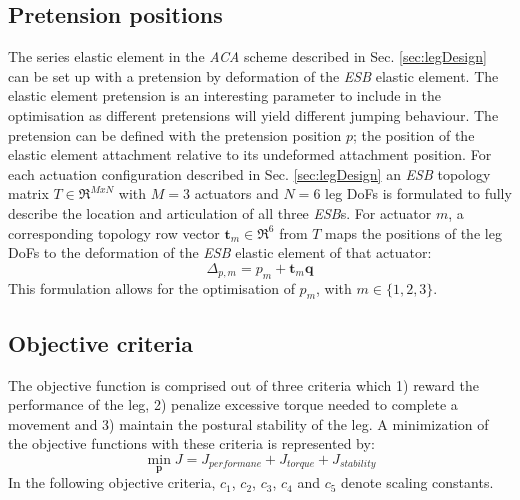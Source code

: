 \documentclass[letterpaper, 10 pt, conference]{ieeeconf}  %
\begin{document}
\subsection{Pretension positions}

The series elastic element in the \textit{ACA} scheme described in Sec. \ref{sec:legDesign} can be set up with a pretension by deformation of the \textit{ESB} elastic element. The elastic element pretension is an interesting parameter to include in the optimisation as different pretensions will yield different jumping behaviour. The pretension can be defined with the pretension position $p$; the position of the elastic element attachment relative to its undeformed attachment position. For each actuation configuration described in Sec. \ref{sec:legDesign} an \textit{ESB} topology matrix $T \in \mathfrak{R}^{M x N}$ with $M=3$ actuators and $N=6$ leg DoFs is formulated to fully describe the location and articulation of all three \textit{ESB}s. For actuator $m$, a corresponding topology row vector $\mathbf{t}_m \in \mathfrak{R}^6$ from $T$ maps the positions of the leg DoFs to the deformation of the \textit{ESB} elastic element of that actuator:
\begin{equation}
\Delta_{p,m} = p_m + \mathbf{t}_m \mathbf{q}
\end{equation}
This formulation allows for the optimisation of $p_m$, with $m \in \{1,2,3\}$.

\subsection{Objective criteria}

The objective function is comprised out of three criteria which 1) reward the performance of the leg, 2) penalize excessive torque needed to complete a movement and 3) maintain the postural stability of the leg. A minimization of the objective functions with these criteria is represented by:   
 \begin{equation}
\min_{\mathbf{p}}\limits J =  J_{performane}+ J_{torque}+ J_{stability}
 \end{equation}
In the following objective criteria, $c_1$, $c_2$, $c_3$, $c_4$ and $c_5$ denote scaling constants.\\
\end{document}
